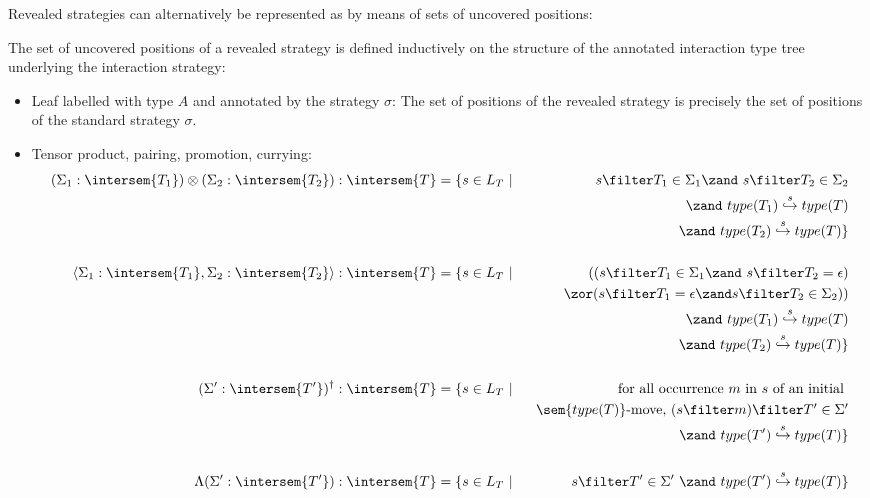 Revealed strategies can alternatively be represented as by means
of sets of uncovered positions:
\begin{definition}
\label{dfn:revealedstrat}
The set of uncovered positions of a revealed strategy is defined inductively on the
structure of the annotated interaction type tree underlying the
interaction strategy:
\begin{itemize}[-]
\item Leaf labelled with type $A$ and annotated by the strategy $\sigma$: The set of positions of the revealed strategy is precisely the set of positions of the standard strategy $\sigma$.

\item Tensor product, pairing, promotion, currying:
\begin{eqnarray*}
(\Sigma_1 : \intersem{T_1}) \otimes (\Sigma_2 : \intersem{T_2}) : \intersem{T} &=\{ s \in L_T \ | \  &s \filter T_1 \in \Sigma_1 \zand\ s \filter T_2 \in \Sigma_2 \\
&& \zand\ type(T_1)\stackrel{s}\hookrightarrow type(T) \\
&& \zand\ type(T_2)\stackrel{s}\hookrightarrow type(T) \}
\\ \\
\langle \Sigma_1 : \intersem{T_1}, \Sigma_2 : \intersem{T_2} \rangle : \intersem{T} &= \{ s \in L_T \ | &
   ( (s \filter T_1 \in \Sigma_1 \zand\ s \filter T_2 = \epsilon) \\
&&  \   \zor ( s \filter T_1 = \epsilon \zand s \filter T_2 \in \Sigma_2)) \\
&& \zand\ type(T_1)\stackrel{s}\hookrightarrow type(T) \\
&& \zand\ type(T_2)\stackrel{s}\hookrightarrow type(T) \}
\\ \\
(\Sigma' : \intersem{T'})^\dagger : \intersem{T} &= \{ s \in L_T \ | \ &
\mbox {for all occurrence $m$ in $s$ of an initial  }\\
&& \mbox{ $\sem{type(T)}$-move, $(s \filter m) \filter T' \in \Sigma'$} \\
&& \zand\ type(T')\stackrel{s}\hookrightarrow type(T) \}
\\ \\
\Lambda(\Sigma' : \intersem{T'}) : \intersem{T} &= \{ s \in L_T \ | & s \filter T' \in \Sigma' \ \zand\ type(T')\stackrel{s}\hookrightarrow type(T) \}
\end{eqnarray*}


\end{itemize}
\end{definition}
